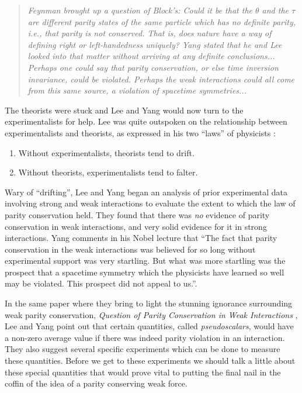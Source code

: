 \documentclass[12pt]{book}
\begin{document}
\begin{quote}
\textit{ Feynman brought up a question of Block's: Could it be that the $\theta$ and the $\tau$ are different parity states of the same particle which has no definite parity, i.e., that parity is not conserved. That is, does nature have a way of defining right or left-handedness uniquely? Yang stated that he and Lee looked into that matter without arriving at any definite conclusions... Perhaps one could say that parity conservation, or else time inversion invariance, could be violated. Perhaps the weak interactions could all come from this same source, a violation of spacetime symmetries...}
\end{quote}

The theorists were stuck and Lee and Yang would now turn to the experimentalists for help. Lee was quite outspoken on the relationship between experimentalists and theorists, as expressed in his two ``laws'' of physicists \cite{lee2}:

\begin{enumerate}
 \item Without experimentalists, theorists tend to drift.
 \item Without theorists, experimentalists tend to falter.
\end{enumerate}

Wary of ``drifting'', Lee and Yang began an analysis of prior experimental data involving strong and weak interactions to evaluate the extent to which the law of parity conservation held. They found that there was \emph{no} evidence of parity conservation in weak interactions, and very solid evidence for it in strong interactions. Yang comments in his Nobel lecture that ``The fact that parity conservation in the weak interactions was believed for so long without experimental support was very startling. But what was more startling was the prospect that a spacetime symmetry which the physicists have learned so well may be violated. This prospect did not appeal to us.''\cite{yang}.

In the same paper where they bring to light the stunning ignorance surrounding weak parity conservation, \emph{Question of Parity Conservation in Weak Interactions} \cite{lee&yang}, Lee and Yang point out that certain quantities, called \emph{pseudoscalars}, would have a non-zero average value if there was indeed parity violation in an interaction. They also suggest several specific experiments which can be done to measure these quantities. Before we get to these experiments we should talk a little about these special quantities that would prove vital to putting the final nail in the coffin of the idea of a parity conserving weak force.
\end{document}
